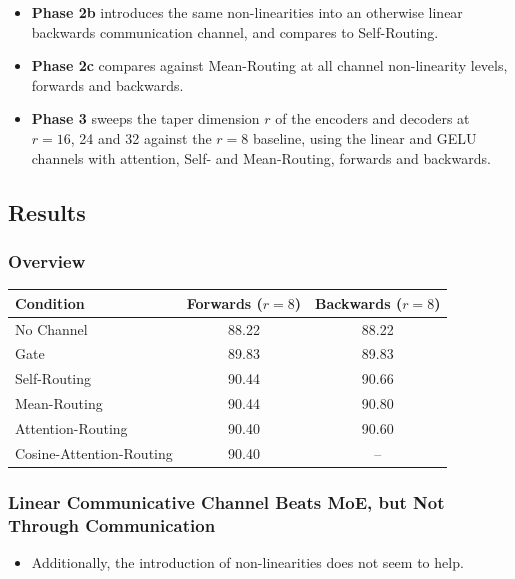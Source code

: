 \documentclass[11pt,a4paper]{article}
\newcommand{\tnote}[1]{\par\vspace{0.6ex}{\footnotesize #1}\par}
\newcommand{\finding}[2][12]{\Needspace{#1\baselineskip}\subsubsection*{#2}}
\begin{document}
\begin{itemize}
\begin{itemize}
            into an otherwise linear forwards communication channel, and compares to Self-Routing.
      \item \textbf{Phase 2b} introduces the same non-linearities into an otherwise linear
            backwards communication channel, and compares to Self-Routing.
      \item \textbf{Phase 2c} compares against Mean-Routing at all channel non-linearity levels,
            forwards and backwards.
      \item \textbf{Phase 3} sweeps the taper dimension $r$ of the encoders and decoders at
            $r = 16$, 24 and 32 against the $r = 8$ baseline, using the linear and GELU channels
            with attention, Self- and Mean-Routing, forwards and backwards.
    \end{itemize}
\end{itemize}

\subsection{Results}

\finding[13]{Overview}

\begin{center}
\begin{tabular}{@{}lcc@{}}
\toprule
Condition & Forwards ($r = 8$) & Backwards ($r = 8$) \\
\midrule
No Channel               & 88.22 & 88.22 \\
Gate                     & 89.83 & 89.83 \\
Self-Routing             & 90.44 & 90.66 \\
Mean-Routing             & 90.44 & 90.80 \\
Attention-Routing        & 90.40 & 90.60 \\
Cosine-Attention-Routing & 90.40 & -- \\
\bottomrule
\end{tabular}
\tnote{Test accuracy (\%). The Gate and No Channel baselines are simply repeated across Forwards
and Backwards, since they lack a directional configuration.}
\end{center}

\finding[20]{Linear Communicative Channel Beats MoE, but Not Through Communication}

\begin{itemize}
  \item Additionally, the introduction of non-linearities does not seem to help.
\end{itemize}
\end{document}
